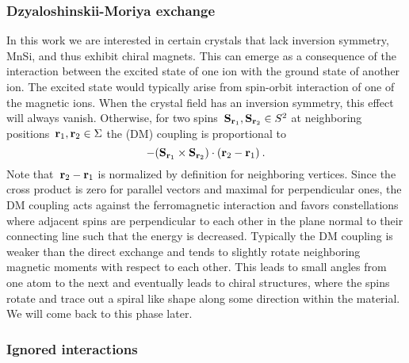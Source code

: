 \subsubsection{Dzyaloshinskii-Moriya exchange}

In this work we are interested in certain crystals that lack inversion symmetry,
\eg{} MnSi, and thus exhibit chiral magnets. This can emerge as a consequence of
the interaction between the excited state of one ion with the ground state of
another ion. The excited state would typically arise from spin-orbit interaction
of one of the magnetic ions.  When the crystal field has an inversion symmetry,
this effect will always vanish. Otherwise, for two spins~$\mathbf{S}_{\mathbf{r}_1}, \mathbf{S}_{\mathbf{r}_2}
\in S^2$ at neighboring positions~$\mathbf{r}_1, \mathbf{r}_2 \in \Sigma$ the  (DM) coupling is proportional to
\begin{equation}
  - (\mathbf{S}_{\mathbf{r}_1} \times \mathbf{S}_{\mathbf{r}_2}) \cdot (\mathbf{r}_2 - \mathbf{r}_1)\:.
\end{equation}
%
Note that~$\mathbf{r}_2 - \mathbf{r}_1$ is normalized by definition for neighboring vertices.
Since the cross product is zero for parallel vectors and maximal for
perpendicular ones, the DM coupling acts against the ferromagnetic interaction
and favors constellations where adjacent spins are perpendicular to each other
in the plane normal to their connecting line such that the energy is decreased.
Typically the DM coupling is weaker than the direct exchange and tends to
slightly rotate neighboring magnetic moments with respect to each other. This
leads to small angles from one atom to the next and eventually leads to chiral
structures, where the spins rotate and trace out a spiral like shape along some
direction within the material. We will come back to this phase later.


\subsubsection{Ignored interactions}

